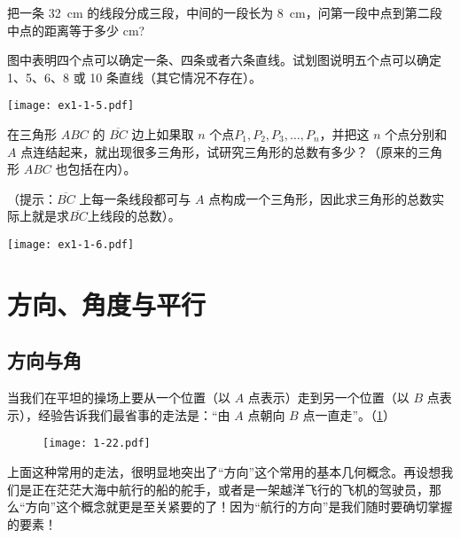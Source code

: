 \begin{Exercise}
\begin{question}
\item 把一条 \qty{32}{cm} 的线段分成三段，中间的一段长为 \qty{8}{cm}，问第一段中点到第二段中点的距离等于多少 \unit{cm}?
\item\label{exec:1-1-5} 图中表明四个点可以确定一条、四条或者六条直线。试划图说明五个点可以确定 1、5、6、8 或 10 条直线（其它情况不存在）。
\begin{figurehere}
	\begin{minipage}{\linewidth}\centering
		\texttt{[image: ex1-1-5.pdf]}
		\caption*{第 \ref{exec:1-1-5} 题}
	\end{minipage}
\end{figurehere}

\item\label{exec:1-1-6} 在三角形 $ABC$ 的 $\overline{BC}$ 边上如果取 $n$ 个点$P_1,P_2,P_3,\ldots,P_n$，并把这 $n$ 个点分别和 $A$ 点连结起来，就出现很多三角形，试研究三角形的总数有多少？（原来的三角形 $ABC$ 也包括在内）。

（提示：$\overline{BC}$ 上每一条线段都可与 $A$ 点构成一个三角形，因此求三角形的总数实际上就是求$\overline{BC}$上线段的总数）。
\begin{figurehere}
	\begin{minipage}{\linewidth}\centering
		\texttt{[image: ex1-1-6.pdf]}
		\caption*{第 \ref{exec:1-1-6} 题}
	\end{minipage}
\end{figurehere}
\end{question}
\end{Exercise}

\section{方向、角度与平行}
\subsection{方向与角}
当我们在平坦的操场上要从一个位置（以 $A$ 点表示）走到另一个位置（以 $B$ 点表示），经验告诉我们最省事的走法是：“由 $A$ 点朝向 $B$ 点一直走”。（\cref{fig:1-22}）

\begin{figure}
	\texttt{[image: 1-22.pdf]}
	\caption{}\label{fig:1-22}
\end{figure}

上面这种常用的走法，很明显地突出了“方向”这个常用的基本几何概念。再设想我们是正在茫茫大海中航行的船的舵手，或者是一架越洋飞行的飞机的驾驶员，那么“方向”这个概念就更是至关紧要的了！因为“航行的方向”是我们随时要确切掌握的要素！

